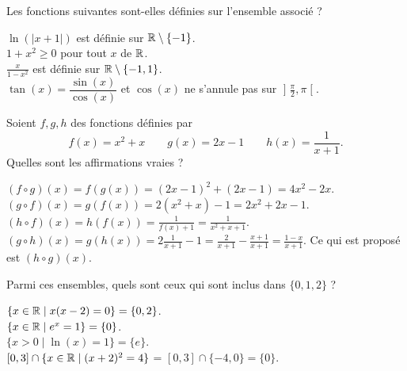\begin{question}
Les fonctions suivantes sont-elles définies sur l'ensemble associé ?
\begin{answers} 
	\good{$x \mapsto \tan(x)$ sur $\mathopen]\frac\pi 2,\pi\mathclose[$}
\end{answers}
\begin{explanations} 
$\ln(|x+1|)$ est définie sur $\mathbb{R} \setminus \{ -1 \}$.\\
$1+x^2\ge 0$ pour tout $x$ de $\mathbb{R}$.\\
$\frac{x}{1-x^2}$ est définie sur $\mathbb{R} \setminus \{ -1,1 \}$.\\
$\tan( x)=\dfrac{\sin(x)}{\cos(x)}$ et $\cos(x)$ ne s'annule pas sur $\mathopen]\frac\pi 2,\pi\mathclose[$.
\end{explanations}
\end{question}


\begin{question}
Soient $f,g,h$ des fonctions définies par 
$$f(x) = x^2+x \qquad g(x) = 2x-1 \qquad h(x) = \frac{1}{x+1}.$$
Quelles sont les affirmations vraies ?
\begin{answers} 
\end{answers}
\begin{explanations} 
$(f \circ g)(x) = f(g(x)) = (2x-1)^2+(2x-1) = 4x^2-2x$. \\
$(g \circ f)(x) = g(f(x)) = 2(x^2+x)-1 = 2x^2+2x-1$. \\
$(h \circ f)(x) = h(f(x)) = \frac{1}{f(x)+1}=\frac 1{x^2+x+1}$.\\
$(g \circ h)(x) = g(h(x)) = 2\frac{1}{x+1} -1 = \frac{2}{x+1} - \frac{x+1}{x+1} = \frac{1-x}{x+1}$. Ce qui est proposé est $(h\circ g)(x)$.
\end{explanations}
\end{question}


\begin{question}
Parmi ces ensembles, quels sont ceux qui sont inclus dans $\{ 0 , 1 , 2 \}$ ?
\begin{answers} 
\end{answers}
\begin{explanations} 
$\{ x \in \mathbb{R} \; | \; x(x-2)=0 \} = \{0,2\}$.\\
$\{ x \in \mathbb{R} \; | \; e^x = 1 \} = \{0\}$.\\
$\{ x > 0 \; | \; \ln(x) = 1 \} = \{ e \}$.\\
$[0,3] \cap \{ x \in \mathbb{R} \; | \; (x+2)^2 = 4  \}$ = $[0,3] \cap \{ -4 , 0\} = \{0\}$. 
\end{explanations}
\end{question}


